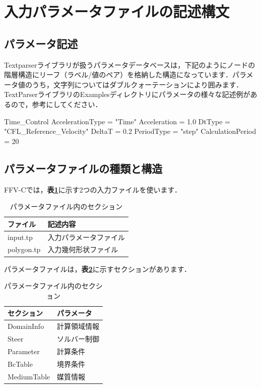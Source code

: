 \graphicspath{{./fig_Param/}}

%
\section{入力パラメータファイルの記述構文}
%
\subsection{パラメータ記述}
Textparserライブラリが扱うパラメータデータベースは，下記のようにノードの階層構造にリーフ（ラベル/値のペア）を格納した構造になっています．パラメータ値のうち，文字列についてはダブルクォーテーションにより囲みます．
TextParserライブラリのExamplesディレクトリにパラメータの様々な記述例があるので，参考にしてください．

{
\small 
\begin{program}
  Time_Control {
    AccelerationType  = "Time"
    Acceleration      = 1.0
    DtType            = "CFL_Reference_Velocity"
    DeltaT            = 0.2
    PeriodType        = "step"
    CalculationPeriod = 20
  }
\end{program}
}


%
\subsection{パラメータファイルの種類と構造}
FFV-Cでは，\textbf{表\ref{tbl:input_files}}に示す2つの入力ファイルを使います．

\begin{table}[htdp]
\caption{パラメータファイル内のセクション}
\begin{center}
\small
\begin{tabular}{ll} \toprule
ファイル & 記述内容\\ \midrule
input.tp & 入力パラメータファイル\\
polygon.tp & 入力幾何形状ファイル\\ \bottomrule
\end{tabular}
\end{center}
\label{tbl:input_files}
\end{table}


パラメータファイルは，\textbf{表\ref{tbl:param_tag}}に示すセクションがあります．


\begin{table}[htdp]
\caption{パラメータファイル内のセクション}
\begin{center}
\small
\begin{tabular}{ll} \toprule
セクション & パラメータ\\ \midrule
DomainInfo & 計算領域情報\\
Steer & ソルバー制御\\
Parameter & 計算条件\\
BcTable & 境界条件\\
MediumTable & 媒質情報\\ \bottomrule
\end{tabular}
\end{center}
\label{tbl:param_tag}
\end{table}


